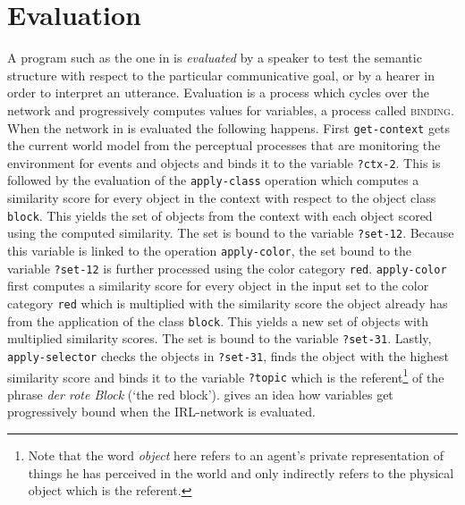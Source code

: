 \section{Evaluation}
A program such as the one in  is \emph{evaluated}
by a speaker to test the semantic structure with respect to the 
particular communicative goal, or by a hearer in order to interpret an utterance.
Evaluation is a process which cycles over the network and progressively computes values
for variables, a process called \textsc{binding}.
When the network in 
is evaluated the following happens. First {\footnotesize\tt get-context} gets the current 
world model from the perceptual processes that are monitoring the 
environment for events and objects and binds it to the variable 
{\footnotesize\tt ?ctx-2}. This is followed by the evaluation of the {\footnotesize\tt apply-class}
operation which computes a similarity score for every object
in the context with respect to the object class {\footnotesize\tt block}. 
This yields the set of objects from the context with each object 
scored using the computed similarity. The set is bound to the variable {\footnotesize\tt ?set-12}. 
Because this variable is linked to the operation {\footnotesize\tt apply-color}, 
the set bound to the variable {\footnotesize\tt ?set-12} is further processed using the 
color category {\footnotesize\tt red}. {\footnotesize\tt apply-color} first computes
a similarity score for every object in the input set to the color category 
{\footnotesize\tt red} which is multiplied with the similarity score the object
already has from the application of the class {\footnotesize\tt block}.
This yields a new set of objects with multiplied similarity scores.
The set is bound to the variable {\footnotesize\tt ?set-31}. Lastly, {\footnotesize\tt apply-selector} 
checks the objects in {\footnotesize\tt ?set-31}, finds the object with 
the highest similarity score and binds it to the variable {\footnotesize\tt ?topic}
which is the referent\footnote{Note that the word \textit{object} here refers 
to an agent's private representation of 
things he has perceived in the world and only 
indirectly refers to the physical object which is the referent.
} of the phrase \textit{der rote Block} (`the red block').
 gives an idea how variables get progressively 
bound when the IRL-network is evaluated.

